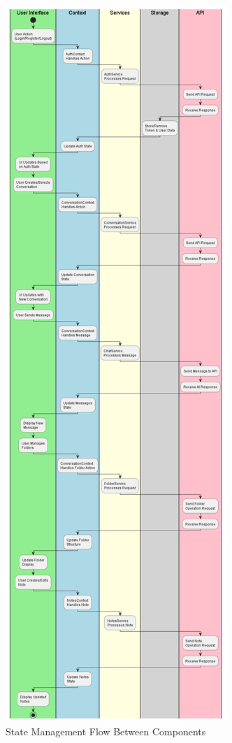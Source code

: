 \begin{figure}[p]
    \centering
    \includegraphics[width=\textwidth]{./Chapter07/figures/state_management_flow.png}
    \caption{State Management Flow Between Components}
    \label{fig:state-management-flow}
\end{figure}
\clearpage

